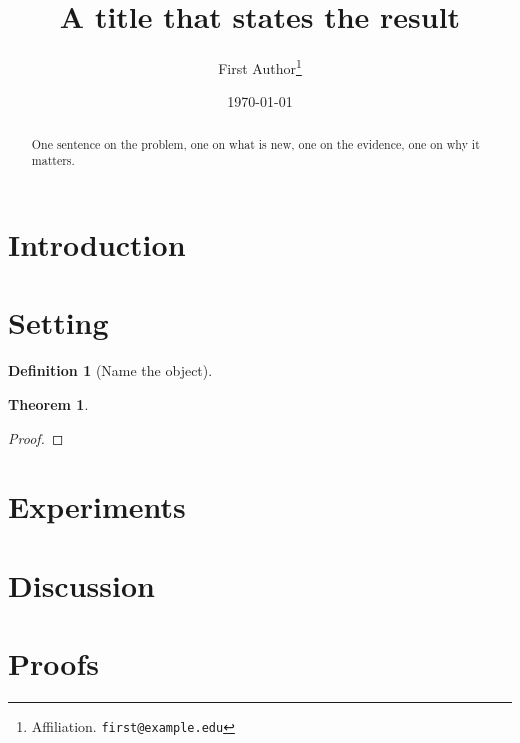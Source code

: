 \documentclass[11pt]{article}
\title{A title that states the result}
\author{First Author\thanks{Affiliation. \texttt{first@example.edu}}}
\date{\today}
\newtheorem{theorem}{Theorem}
\newtheorem{definition}{Definition}
\begin{document}
\maketitle

\begin{abstract}
One sentence on the problem, one on what is new, one on the evidence, one on why it matters.
\end{abstract}

\section{Introduction}
\label{sec:intro}

\section{Setting}
\label{sec:setting}

\begin{definition}[Name the object]
  \label{def:object}
\end{definition}

\begin{theorem}
  \label{thm:main}
\end{theorem}

\begin{proof}
\end{proof}

\section{Experiments}
\label{sec:experiments}

\section{Discussion}
\label{sec:discussion}

\appendix
\section{Proofs}
\label{app:proofs}



\end{document}
